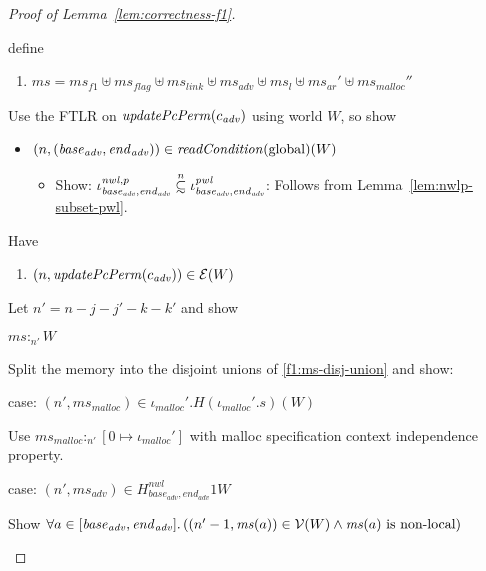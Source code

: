 \documentclass[a4paper]{article}
\newcommand\subsetsim{\mathrel{\ooalign{\raise.2ex\hbox{$\subset$}\cr
      \hidewidth\lower.8ex\hbox{\scalebox{0.9}{$\sim$}}\hidewidth\cr}}}
\newcommand{\nsubsim}[1][n]{\stackrel{\tiny{#1}}{\subsetsim}}
\newcommand{\var}[1]{\mathit{#1}}
\newcommand{\hs}{\var{ms}}
\newcommand{\ms}{\hs}
\newcommand{\start}{\var{base}}
\newcommand{\addrend}{\var{end}}
\newcommand{\heap}{\var{mem}}
\newcommand{\adv}{\var{adv}}
\newcommand{\flag}{\var{flag}}
\newcommand{\nwl}{\var{nwl}}
\newcommand{\pwl}{\var{pwl}}
\newcommand{\plainfun}[2]{
  \ifthenelse{\equal{#2}{}}
  {\mathit{#1}}
  {\mathit{#1}(#2)}
}
\newcommand{\updatePcPerm}[1]{\plainfun{updatePcPerm}{#1}}
\newcommand{\readCond}[1]{\plainfun{readCondition}{#1}}
\newcommand{\heapSat}[3][\heap]{#1 :_{#2} #3}
\newcommand{\codelabel}[1]{\mathit{#1}}
\newcommand{\malloc}{\codelabel{malloc}}
\newcommand{\asmType}{\plaindom{AsmType}}
\newcommand{\plaindom}[1]{\mathrm{#1}}
\newcommand{\intr}[2]{\mathcal{#1}}
\newcommand{\valueintr}[1]{\intr{V}{#1}}
\newcommand{\exprintr}[1]{\intr{E}{#1}}
\newcommand{\stdvr}{\valueintr{\asmType}}
\newcommand{\stder}{\exprintr{\asmType}}
\newcommand{\npair}[2][n]{\left(#1,#2 \right)}
\newcommand{\plainperm}[1]{\mathrm{#1}}
\newcommand{\glob}{\plainperm{global}}
\newcommand{\nonlocal}[1]{\ensuremath{#1} \text{ is non-local}}
\begin{document}
\begin{proof}[Proof of Lemma~\ref{lem:correctness-f1}]
\begin{itemize}
  \end{itemize}
  define
  \begin{enumerate}
  \item $\ms = \hs_{f1} \uplus 
    \hs_\flag \uplus                
    \ms_{\var{link}} \uplus 
    \hs_\adv \uplus 
    \ms_{l} \uplus
    \ms_{\var{ar}}' \uplus
    \ms_{\malloc}'' $ \label{f1:ms-disj-union}
  \end{enumerate}
  Use the FTLR on $\updatePcPerm{c_{\var{adv}}}$ using world $W$, so show
  \begin{itemize}
  \item $\npair{(\start_{\adv},\addrend_{\adv})} \in \readCond{}(\glob)(W)$
    \begin{itemize}
    \item Show: $\iota^{\nwl,p}_{\start_\adv,\addrend_\adv} \nsubsim[n] \iota^\pwl_{\start_\adv,\addrend_\adv}$: Follows from Lemma~\ref{lem:nwlp-subset-pwl}.
    \end{itemize}
  \end{itemize}
  Have
  \begin{enumerate}[resume]
  \item $\npair{\updatePcPerm{c_{\var{adv}}}} \in \stder(W)$
  \end{enumerate}
  Let $n' = n - j - j'-k-k'$ and show
  \begin{enumproof}[resume]
  \item $\heapSat[\ms]{n'}{W}$
    \begin{enumproof}
    \item Split the memory into the disjoint unions of \ref{f1:ms-disj-union} and show:
      \begin{enumproof}
      \item case: $\npair[n']{\ms_\malloc} \in \iota_\malloc'.H (\iota_\malloc'.s) (W)$ 
        \begin{enumproof}
        \item Use $\heapSat[\ms_\malloc]{n'}{[0 \mapsto \iota_\malloc']}$ with malloc specification context independence property.
        \end{enumproof}
      \item case: $\npair[n']{\ms_\adv} \in H^\nwl_{\start_\adv,\addrend_\adv} 1 W$ \label{lem:f1-adv-mem-sat}
        \begin{enumproof}
        \item Show $\forall a \in [\start_\adv,\addrend_\adv] \ldotp (\npair[n'-1]{\ms(a)} \in \stdvr(W) \land \nonlocal{\ms(a)})$
        \end{enumproof}

\end{enumproof}
\end{enumproof}
\end{enumproof}
\end{proof}
\end{document}
